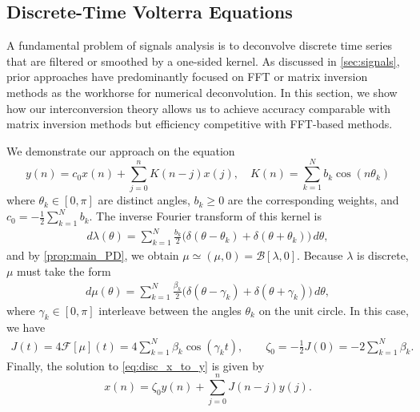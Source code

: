 \documentclass{cams-l} %
\newcommand{\dave}[1]{#1}\newcommand{\davebegin}{}\newcommand{\daveend}{}\newcommand{\george}[1]{#1}
\newcommand{\cB}{\mathcal B}
\newcommand{\cF}{\mathcal F}
\theoremstyle{definition}
\theoremstyle{remark}
\numberwithin{equation}{section}
\begin{document}
\subsection{Discrete-Time Volterra Equations}\label{sec:discrete_num}
\george{A fundamental problem of signals analysis is to deconvolve discrete time series that are filtered or smoothed by a one-sided kernel. As discussed in \cref{sec:signals}, prior approaches have predominantly focused on FFT or matrix inversion methods as the workhorse for numerical deconvolution.} \dave{In this section, we show how our interconversion theory allows us to achieve accuracy comparable with matrix inversion methods but efficiency competitive with FFT-based methods.}

We demonstrate our approach on the equation
\begin{equation}\label{eq:disc_x_to_y}
    y(n) = c_0x(n) + \sum_{j=0}^n K(n-j)x(j), \quad K(n) = \sum_{k=1}^N b_k\cos(n\theta_k)
\end{equation}
where $\theta_k \in [0, \pi]$ are distinct angles, $b_k\geq0$ are the corresponding weights, and $c_0 = -\tfrac{1}{2}\sum_{k=1}^N b_k$. The inverse Fourier transform of this kernel is
\begin{align*}
    d\lambda(\theta) = \sum_{k=1}^N\frac{b_k}{2}\Big(\delta(\theta - \theta_k) + \delta(\theta + \theta_k)\Big)\,d\theta,
\end{align*}
and by \cref{prop:main_PD}, we obtain $\mu\simeq (\mu, 0) = \cB[\lambda, 0]$. Because $\lambda$ is discrete, $\mu$ must take the form
\begin{align*}
    d\mu(\theta) = \sum_{k=1}^N\frac{\beta_k}{2}\Big(\delta(\theta - \gamma_k) + \delta(\theta + \gamma_k)\Big)\,d\theta,
\end{align*}
where $\gamma_k \in [0, \pi]$ interleave between the angles $\theta_k$ on the unit circle. In this case, we have
\begin{align*}
    J(t) = 4\cF[\mu](t) = 4\sum_{k=1}^N \beta_k\cos(\gamma_k t),\qquad \zeta_0 = - \tfrac{1}{2}J(0) = -2\sum_{k=1}^N \beta_k.
\end{align*}
Finally, the solution to \cref{eq:disc_x_to_y} is given by
\begin{equation}\label{eq:disc_y_to_x}
    x(n) = \zeta_0y(n) + \sum_{j=0}^n J(n-j)y(j).
\end{equation}
\end{document}
